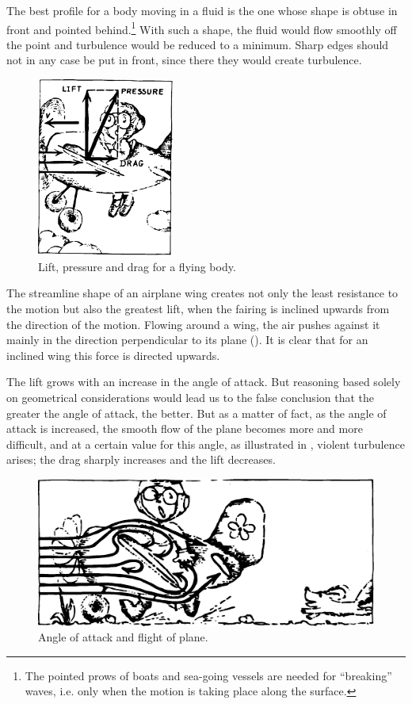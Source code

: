 The best profile for a body moving in a fluid is the one whose shape is obtuse in front and pointed behind.\footnote{The pointed prows of boats and sea-going vessels are needed for ``breaking'' waves, i.e. only when the motion is taking place along the surface.} With such a shape, the fluid would flow smoothly off the point and turbulence would be reduced to a minimum. Sharp edges should not in any case be put in front, since there they would create turbulence.
\begin{figure}[!ht]
\centering
\includegraphics[width=0.4\textwidth]{figures/fig-06-04.pdf}
\caption{Lift, pressure and drag for a flying body.}
\label{fig-6.4}
\end{figure}

The streamline shape of an airplane wing creates not only the least resistance to the motion but also the great­est lift, when the fairing is inclined upwards from the direction of the motion. Flowing around a wing, the air pushes against it mainly in the direction perpendicular to its plane (). It is clear that for an inclined wing this force is directed upwards.

The lift grows with an increase in the angle of attack. But reasoning based solely on geometrical considerations would lead us to the false conclusion that the greater the angle of attack, the better. But as a matter of fact, as the angle of attack is increased, the smooth flow of the plane becomes more and more difficult, and at a certain value for this angle, as illustrated in , violent turbulence arises; the drag sharply increases and the lift decreases.

\begin{figure}[!ht]
\centering
\includegraphics[width=\textwidth]{figures/fig-06-05.pdf}
\caption{Angle of attack and flight of plane.}
\label{fig-6.5}
\end{figure}

